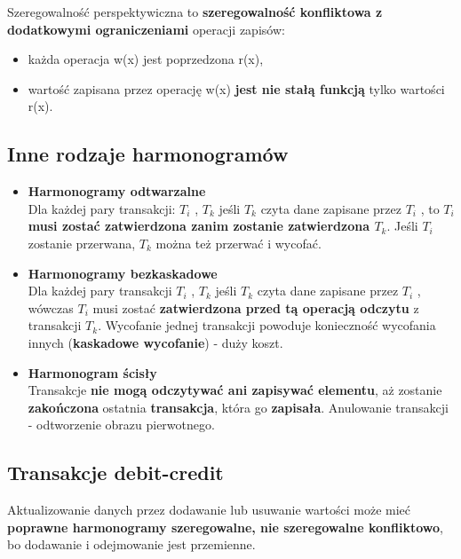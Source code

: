 \documentclass[a4paper]{article}
\begin{document}
Szeregowalność perspektywiczna to \textbf{szeregowalność konfliktowa z dodatkowymi ograniczeniami} operacji zapisów: 
\begin{itemize}
    \item każda operacja w(x) jest poprzedzona r(x),
    \item wartość zapisana przez operację w(x) \textbf{jest nie stałą funkcją} tylko wartości r(x).
\end{itemize}

\subsection{Inne rodzaje harmonogramów}
\begin{itemize}
    \item \textbf{Harmonogramy odtwarzalne}\\
    Dla każdej pary transakcji: $T_i$ , $T_k$ jeśli $T_k$ czyta dane zapisane przez $T_i$ , to \textbf{$T_i$ musi zostać zatwierdzona zanim zostanie zatwierdzona $T_k$}. Jeśli $T_i$ zostanie przerwana, $T_k$ można też przerwać i wycofać.\\
    
    \item \textbf{Harmonogramy bezkaskadowe}\\
    Dla każdej pary transakcji $T_i$ , $T_k$ jeśli $T_k$ czyta dane zapisane przez $T_i$ , wówczas $T_i$ musi zostać \textbf{zatwierdzona przed tą operacją odczytu} z transakcji $T_k$. Wycofanie jednej transakcji powoduje konieczność wycofania innych (\textbf{kaskadowe wycofanie}) - duży koszt.\\
    
    \item \textbf{Harmonogram ścisły}\\
    Transakcje \textbf{nie mogą odczytywać ani zapisywać elementu}, aż zostanie \textbf{zakończona} ostatnia \textbf{transakcja}, która go \textbf{zapisała}. Anulowanie transakcji - odtworzenie obrazu pierwotnego.
\end{itemize}

\subsection{Transakcje debit-credit}
Aktualizowanie danych przez dodawanie lub usuwanie wartości może mieć \textbf{poprawne harmonogramy szeregowalne, nie szeregowalne konfliktowo}, bo dodawanie i odejmowanie jest przemienne.
\end{document}

